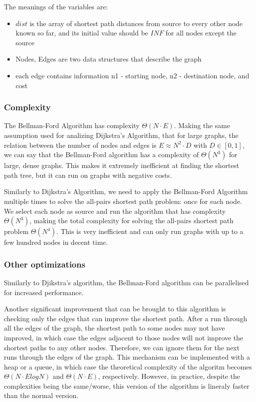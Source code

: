 \documentclass[runningheads]{llncs}
\begin{document}
The meanings of the variables are:
\begin{itemize}
	\item $dist$ is the array of shortest path distances from source to every other node known so far, and its initial value should be $INF$ for all nodes except the source
	\item Nodes, Edges are two data structures that describe the graph
	\item each edge contains information n1 - starting node, n2 - destination node, and cost
\end{itemize}

\subsubsection{Complexity}
The Bellman-Ford Algorithm has complexity $\Theta(N \cdot E)$. Making the same assumption used for analizing Dijkstra's Algorithm, that for large graphs, the relation between the number of nodes and edges is $E \approx N^2 \cdot D$ with $D \in [0,1]$, we can say that the Bellman-Ford algorithm has a complexity of $\Theta(N^3)$ for large, dense graphs. This makes it extremely inefficient at finding the shortest path tree, but it can run on graphs with negative costs.

Similarly to Dijkstra's Algorithm, we need to apply the Bellman-Ford Algorithm multiple times to solve the all-pairs shortest path problem: once for each node. We select each node as source and run the algorithm that has complexity $\Theta(N^3)$, making the total complexity for solving the all-pairs shortest path problem $\Theta(N^4)$. This is very inefficient and can only run graphs with up to a few hundred nodes in decent time.

\subsubsection{Other optimizations}
Similarly to Djikstra's algorithm, the Bellman-Ford algorithm can be parallelised for increased performance.

Another significant improvement that can be brought to this algorithm is checking only the edges that can improve the shortest path. After a run through all the edges of the graph, the shortest path to some nodes may not have improved, in which case the edges adjacent to those nodes will not improve the shortest paths to any other nodes. Therefore, we can ignore them for the next runs through the edges of the graph. This mechanism can be implemented with a heap or a queue, in which case the theoretical complexity of the algoritm becomes $\Theta(N \cdot ElogN)$ and $\Theta(N \cdot E)$, respectively\cite{ref_url_IABF}. However, in practice, despite the complexities being the same/worse, this version of the algorithm is lineraly faster than the normal version.
\end{document}
